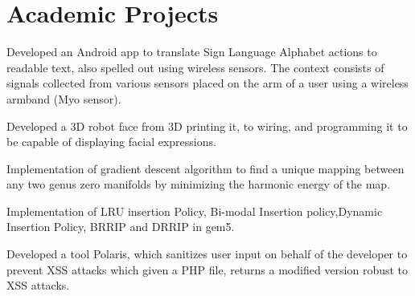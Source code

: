 \documentclass[hidelinks,letterpaper]{deedy-resume-openfont} %
\begin{document}
\begin{minipage}[t]{0.66\textwidth}

\sectionsep
\section{Academic Projects}

\small Developed an Android app to translate Sign Language Alphabet actions to readable text, also spelled out using wireless sensors. The context consists of signals collected from various sensors placed on the arm of a user using a wireless armband (Myo sensor). 

\small Developed a 3D robot face from 3D printing it, to wiring, and programming it to be capable of displaying facial expressions.

\small Implementation of gradient descent algorithm to find a unique mapping between any two genus zero manifolds by minimizing the harmonic energy of the map.

\small Implementation of LRU insertion Policy, Bi-modal Insertion policy,Dynamic Insertion Policy, BRRIP and DRRIP in gem5.



\small Developed a tool Polaris, which sanitizes user input on behalf of the developer to prevent XSS attacks which given a PHP file, returns a modified version robust to XSS attacks.



\end{minipage}
\end{document}

